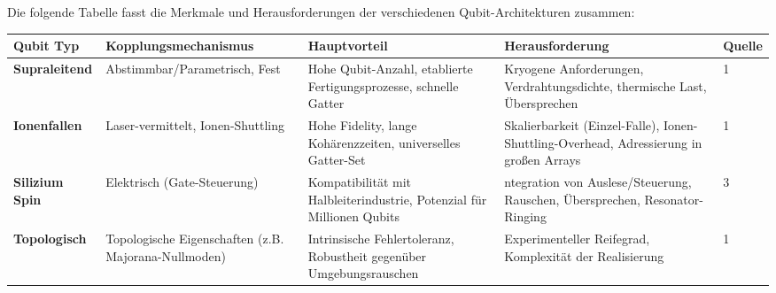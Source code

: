 Die folgende Tabelle fasst die Merkmale und Herausforderungen der verschiedenen Qubit-Architekturen zusammen:
\begin{table}[h]
  \centering %
\begin{tabular}{ |p{}|p{}|p{3cm}|p{3cm}|p{1cm}|  }
 \hline
 \textbf{Qubit Typ}& \textbf{Kopplungsmechanismus} & \textbf{Hauptvorteil} & \textbf{Herausforderung} & \textbf{Quelle}\\
 \hline
 \textbf{Supraleitend}   & Abstimmbar/Parametrisch, Fest    & Hohe Qubit-Anzahl, etablierte Fertigungsprozesse, schnelle Gatter & Kryogene Anforderungen, Verdrahtungsdichte, thermische Last, Übersprechen & 1\\
 \hline
  \textbf{Ionenfallen}   & Laser-vermittelt, Ionen-Shuttling    & Hohe Fidelity, lange Kohärenzzeiten, universelles Gatter-Set & Skalierbarkeit (Einzel-Falle), Ionen-Shuttling-Overhead, Adressierung in großen Arrays & 1\\
 \hline
  \textbf{Silizium Spin}   & Elektrisch (Gate-Steuerung)    & Kompatibilität mit Halbleiterindustrie, Potenzial für Millionen Qubits & ntegration von Auslese/Steuerung, Rauschen, Übersprechen, Resonator-Ringing & 3\\
 \hline
   \textbf{Topologisch}   & Topologische Eigenschaften (z.B. Majorana-Nullmoden)    & Intrinsische Fehlertoleranz, Robustheit gegenüber Umgebungsrauschen & Experimenteller Reifegrad, Komplexität der Realisierung & 1\\
 \hline

 \hline
\end{tabular}
\end{table}
